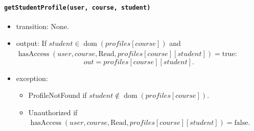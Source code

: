 \documentclass[12pt, titlepage]{article}
\begin{document}
\paragraph{\texttt{getStudentProfile(user, course, student)}}
\begin{itemize}
    \item transition: None.
    \item output: If $student\in\operatorname{dom}(\mathit{profiles}[course])$ and $\operatorname{hasAccess}(user,course,\text{Read},\mathit{profiles}[course][student])=\text{true}$:
    \[
    out=\mathit{profiles}[course][student].
    \]
    \item exception:
    \begin{itemize}
        \item ProfileNotFound if $student\notin\operatorname{dom}(\mathit{profiles}[course])$.
        \item Unauthorized if $\operatorname{hasAccess}(user,course,\text{Read},\mathit{profiles}[course][student])=\text{false}$.
    \end{itemize}
\end{itemize}
\end{document}
